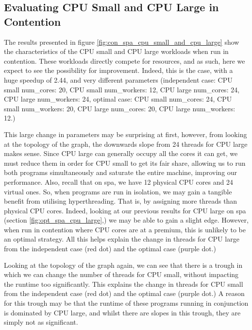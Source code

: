\subsection{Evaluating CPU Small and CPU Large in Contention}
\label{section:results:evaluating_cpu_small_and_cpu_large_in_contention}

The results presented in figure \ref{fig:con_spa_cpu_small_and_cpu_large} show the characteristics of the CPU small and CPU large workloads when run in contention. These workloads directly compete for resources, and as such, here we expect to see the possibility for improvement. Indeed, this is the case, with a huge speedup of 2.44, and very different parameters (independent case: CPU small num\_cores: 20, CPU small num\_workers: 12, CPU large num\_cores: 24, CPU large num\_workers: 24, optimal case: CPU small num\_cores: 24, CPU small num\_workers: 20, CPU large num\_cores: 20, CPU large num\_workers: 12.)

This large change in parameters may be surprising at first, however, from looking at the topology of the graph, the downwards slope from 24 threads for CPU large makes sense. Since CPU large can generally occupy all the cores it can get, we must reduce them in order for CPU small to get its fair share, allowing us to run both programs simultaneously and saturate the entire machine, improving our performance. Also, recall that on spa, we have 12 physical CPU cores and 24 virtual ones. So, when programs are run in isolation, we may gain a tangible benefit from utilising hyperthreading. That is, by assigning more threads than physical CPU cores. Indeed, looking at our previous results for CPU large on spa (section \ref{fig:opt_spa_cpu_large},) we may be able to gain a slight edge. However, when run in contention where CPU cores are at a premium, this is unlikely to be an optimal strategy. All this helps explain the change in threads for CPU large from the independent case (red dot) and the optimal case (purple dot.)

Looking at the topology of the graph again, we can see that there is a trough in which we can change the number of threads for CPU small, without impacting the runtime too significantly. This explains the change in threads for CPU small from the independent case (red dot) and the optimal case (purple dot.) A reason for this trough may be that the runtime of these programs running in conjunction is dominated by CPU large, and whilst there are slopes in this trough, they are simply not as significant.

